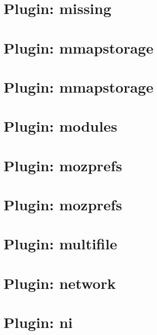 \let\mypdfximage\pdfximage\def\pdfximage{\immediate\mypdfximage}\documentclass[twoside]{book}
\newcommand{\+}{\discretionary{\mbox{\scriptsize$\hookleftarrow$}}{}{}}
\begin{document}
\chapter{Plugin\+: missing}
\label{md_src_plugins_missing_README}

\chapter{Plugin\+: mmapstorage}
\label{md_src_plugins_mmapstorage_README}

\chapter{Plugin\+: mmapstorage}
\label{md_src_plugins_mmapstorage_shelltests}

\chapter{Plugin\+: modules}
\label{md_src_plugins_modules_README}

\chapter{Plugin\+: mozprefs}
\label{md_src_plugins_mozprefs_autoconfig_README}

\chapter{Plugin\+: mozprefs}
\label{md_src_plugins_mozprefs_README}

\chapter{Plugin\+: multifile}
\label{md_src_plugins_multifile_README}

\chapter{Plugin\+: network}
\label{md_src_plugins_network_README}

\chapter{Plugin\+: ni}
\label{md_src_plugins_ni_README}

\end{document}
